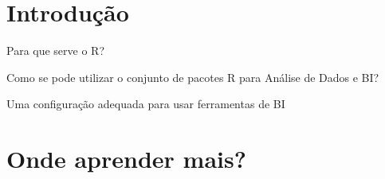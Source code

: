 \documentclass[12pt,a4paper,oneside]{erdc}
\begin{document}







\maketitle

\tableofcontents




\mainmatter


\chapter{Introdução }

Para que serve o R?

Como se pode utilizar o conjunto de pacotes R para Análise de Dados e BI?

Uma configuração adequada para usar ferramentas de BI 

		


















\chapter{Onde aprender mais?}



%








\end{document}

